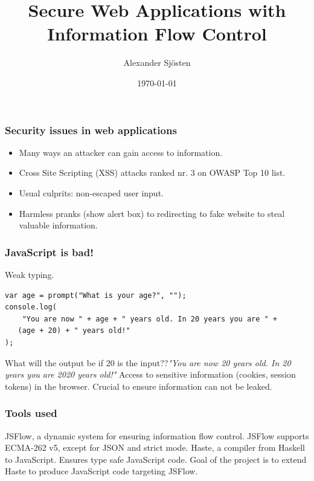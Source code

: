 \documentclass{beamer}
\title[SWAP-IFC]{Secure Web Applications with Information Flow Control}
\author{Alexander Sjösten}
\institute[GU]
{
Master's Thesis in Computer Science \\
\medskip
Examiner: Andrei Sabelfeld 
}
\date{\today}
\begin{document}
\begin{frame}
\titlepage
\end{frame}


\begin{frame}
  \frametitle{Security issues in web applications}
  \begin{itemize}
    \item Many ways an attacker can gain access to information. \pause
    \item Cross Site Scripting (XSS) attacks ranked nr. 3 on OWASP Top 10 list. \pause
    \item Usual culprits: non-escaped user input. \pause
    \item Harmless pranks (show alert box) to redirecting to fake website to steal valuable information.
  \end{itemize}
\end{frame}


\begin{frame}[fragile]
  \frametitle{JavaScript is bad!}
  Weak typing.
  \begin{block}{}
\begin{verbatim}
var age = prompt("What is your age?", "");
console.log(
    "You are now " + age + " years old. In 20 years you are " +
   (age + 20) + " years old!"
);
\end{verbatim}
  \end{block}
  What will the output be if 20 is the input??\pause \emph{"You are now 20 years old. In 20 years you are 2020 years old!"}
  \pause
  \newline
  Access to sensitive information (cookies, session tokens) in the browser. \pause
  Crucial to ensure information can not be leaked.
\end{frame}


\begin{frame}
  \frametitle{Tools used}
  JSFlow, a dynamic system for ensuring information flow control. \pause
  \newline
  JSFlow supports ECMA-262 v5, except for JSON and strict mode. \pause
  \newline
  \newline
  Haste, a compiler from Haskell to JavaScript. \pause
  \newline
  Ensures type safe JavaScript code. \pause
  \newline
  \newline
  Goal of the project is to extend Haste to produce JavaScript code targeting JSFlow.
\end{frame}
\end{document}
